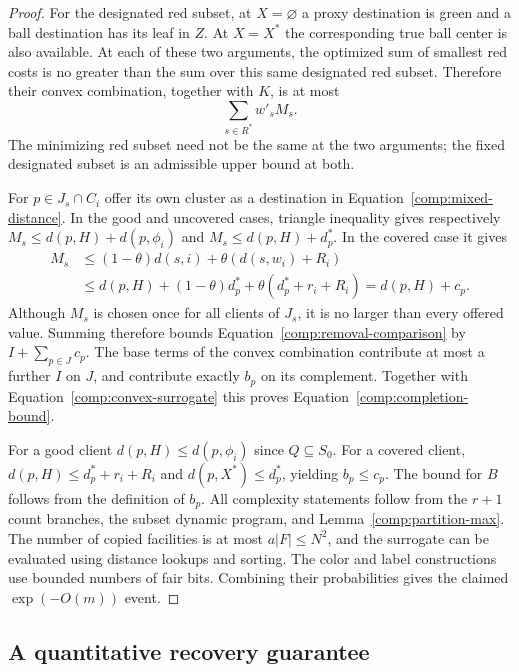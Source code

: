 \begin{proof}
For the designated red subset, at $X=\varnothing$ a proxy destination
is green and a ball destination has its leaf in $Z$.  At $X=X^*$ the
corresponding true ball center is also available.  At each of these
two arguments, the optimized sum of smallest red costs is no greater
than the sum over this same designated red subset.  Therefore their
convex combination, together with $K$, is at most
\begin{equation}
 \sum_{s\in R^*}w'_sM_s.
 \label{comp:removal-comparison}
\end{equation}
The minimizing red subset need not be the same at the two arguments;
the fixed designated subset is an admissible upper bound at both.

For $p\in J_s\cap C_i$ offer its own cluster as a destination in
Equation~\eqref{comp:mixed-distance}.  In the good and uncovered cases,
triangle inequality gives respectively
$M_s\le d(p,H)+d(p,\phi_i)$ and
$M_s\le d(p,H)+d_p^*$.  In the covered case it gives
\[
 \begin{split}
 M_s&\le(1-\theta)d(s,i)+\theta(d(s,w_i)+R_i)\\
 &\le d(p,H)+(1-\theta)d_p^*
            +\theta(d_p^*+r_i+R_i)
   =d(p,H)+c_p.
 \end{split}
\]
Although $M_s$ is chosen once for all clients of $J_s$, it is no larger
than every offered value.  Summing therefore bounds
Equation~\eqref{comp:removal-comparison} by $I+\sum_{p\in J}c_p$.
The base terms of the convex combination contribute at most a further
$I$ on $J$, and contribute exactly $b_p$ on its complement.  Together
with Equation~\eqref{comp:convex-surrogate} this proves
Equation~\eqref{comp:completion-bound}.

For a good client $d(p,H)\le d(p,\phi_i)$ since $Q\subseteq S_0$.
For a covered client, $d(p,H)\le d_p^*+r_i+R_i$ and
$d(p,X^*)\le d_p^*$, yielding $b_p\le c_p$.  The bound for $B$ follows
from the definition of $b_p$.  All complexity statements follow from
the $r+1$ count branches, the subset dynamic program, and
Lemma~\ref{comp:partition-max}.  The number of copied facilities is at
most $a|F|\le N^2$, and the surrogate can be evaluated using distance
lookups and sorting.  The color and label constructions use bounded
numbers of fair bits.  Combining their probabilities gives the claimed
$\exp(-O(m))$ event.
\end{proof}

\subsection{A quantitative recovery guarantee}

